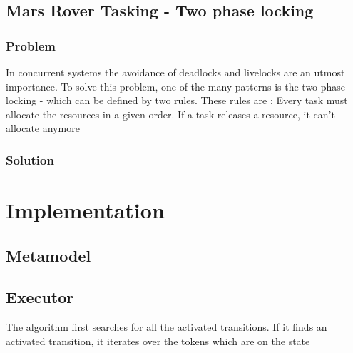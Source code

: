 		
		
		\subsection{Mars Rover Tasking - Two phase locking}
			\subsubsection{Problem}
				In concurrent systems the avoidance of deadlocks and livelocks are an utmost importance.
				To solve this problem, one of the many patterns is  the two phase locking - which can be defined by two rules.
				These rules are : 
					Every task must allocate the resources in a given order.
					If a task releases a resource, it can't allocate anymore
			\subsubsection{Solution}

	\section{Implementation}
		\subsection{Metamodel}
		\subsection{Executor}
			The algorithm first searches for all the activated transitions.
			If it finds an activated transition, it iterates over the tokens which are on the state 